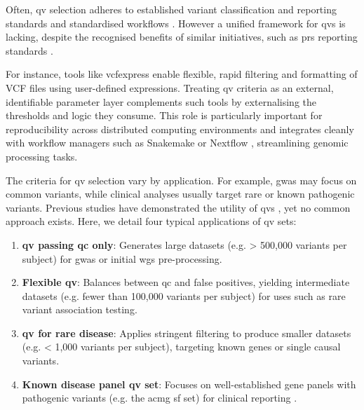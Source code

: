 Often, \ac{qv} selection adheres to established variant classification and reporting standards \cite{richards2015standards, li2017standards, li2017intervar, riggs2020technical, tavtigian2020fitting} and standardised workflows \cite{pedersen2021effective, anderson2010data, uffelmann2021genome}. 
However a unified framework for \ac{qv}s is lacking, despite the recognised benefits of similar initiatives, such as \ac{prs} reporting standards \cite{wand2021improving, lambert2021polygenic}.

For instance, tools like vcfexpress \cite{pedersen_vcfexpress_2025} enable flexible, rapid filtering and formatting of VCF files using user-defined expressions. Treating \ac{qv} criteria as an external, identifiable parameter layer complements such tools by externalising the thresholds and logic they consume. This role is particularly important for reproducibility across distributed computing environments \cite{bal_programming_1989} and integrates cleanly with workflow managers such as Snakemake \cite{molder_sustainable_2021} or Nextflow \cite{di_tommaso_nextflow_2017}, streamlining genomic processing tasks.


The criteria for \ac{qv} selection vary by application. 
For example, \ac{gwas} may focus on common variants, while clinical analyses usually target rare or known pathogenic variants. 
Previous studies have demonstrated the utility of \ac{qv}s \cite{povysil2019rare, cirulli2015exome}, yet no common approach exists. 
Here, we detail four typical applications of \ac{qv} sets:
\begin{enumerate}
    \item \textbf{\ac{qv} passing \ac{qc} only}: Generates large datasets (e.g. > 500,000 variants per subject) for \ac{gwas} or initial \ac{wgs} pre-processing.
    \item \textbf{Flexible \ac{qv}}: Balances between \ac{qc} and false positives, yielding intermediate datasets (e.g. fewer than 100,000 variants per subject) for uses such as rare variant association testing.
    \item \textbf{\ac{qv} for rare disease}: Applies stringent filtering to produce smaller datasets (e.g. < 1,000 variants per subject), targeting known genes or single causal variants.
    \item \textbf{Known disease panel \ac{qv} set}: Focuses on well-established gene panels with pathogenic variants (e.g. the \ac{acmg} \ac{sf} set) for clinical reporting \cite{miller2023acmg}.
\end{enumerate}

